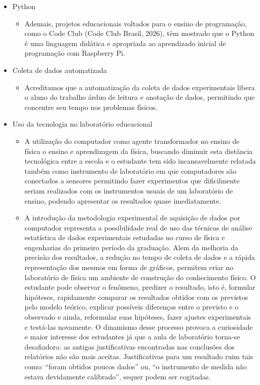 \documentclass{article}
\begin{document}
\begin{itemize}
\begin{itemize}
		\end{itemize}
	\item{Python}
		\begin{itemize}
			\item Ademais, projetos educacionais voltados para o ensino de programação, como o Code Club (Code Club Brasil, 2026), têm mostrado que o Python é uma linguagem didática e apropriada ao aprendizado inicial de programação com Raspberry Pi. \cite{rogerio}
		\end{itemize}
	\item{Coleta de dados automatizada}
		\begin{itemize}
			\item Acreditamos que a automatização da coleta de dados experimentais libera o aluno do trabalho árduo de leitura e anotação de dados, permitindo que concentre seu tempo nos problemas físicos. \cite{newton}
		\end{itemize}
	\item{Uso da tecnologia no laboratório educacional}
		\begin{itemize}
			\item A utilização do computador como agente transformador no ensino de física o ensino e aprendizagem da física, buscando diminuir esta distância tecnológica entre a escola e o estudante tem sido incansavelmente relatada também como instrumento de laboratório em que computadores são conectados a sensores permitindo fazer experimentos que dificilmente seriam realizados com os instrumentos usuais de um laboratório de ensino, podendo apresentar os resultados quase imediatamente. \cite{iniciantes}
			\item A introdução da metodologia experimental de aquisição de dados por computador representa a possibilidade real de uso das técnicas de análise estatística de dados experimentais estudadas no curso de física e engenharias do primeiro período da graduação. Alem da melhoria da precisão dos resultados, a redução no tempo de coleta de dados e a rápida representação dos mesmos em forma de gráficos, permitem criar no laboratório de física um ambiente de construção do conhecimento físico. O estudante pode observar o fenômeno, predizer o resultado, isto é, formular hipóteses, rapidamente comparar os resultados obtidos com os previstos pelo modelo teórico, explicar possíveis diferenças entre o previsto e o observado e ainda, reformular suas hipóteses, fazer ajustes experimentais e testá-las novamente. O dinamismo desse processo provoca a curiosidade e maior interesse dos estudantes já que a aula de laboratório torna-se desafiadora: as antigas justificativas encontradas nas conclusões dos relatórios não são mais aceitas. Justificativas para um resultado ruim tais como: ``foram obtidos poucos dados'' ou, ``o instrumento de medida não estava devidamente calibrado'', sequer podem ser cogitadas. \cite{iniciantes}

\end{itemize}
\end{itemize}
\end{document}
